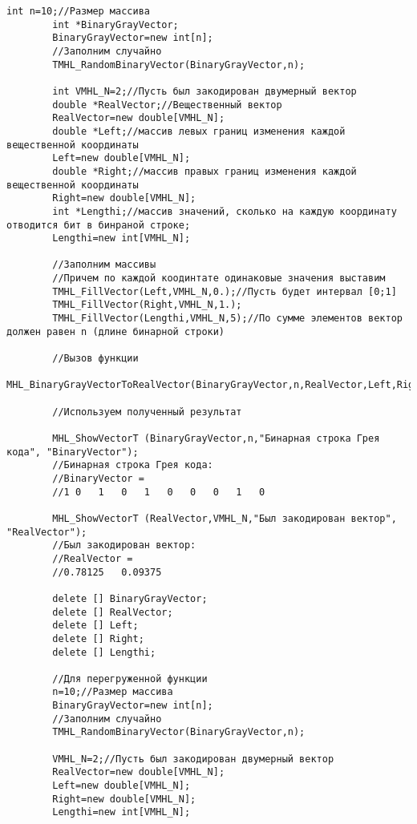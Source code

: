 \documentclass[a4paper,12pt]{article}
\begin{document}
\begin{lstlisting}[label=code_use_MHL_BinaryGrayVectorToRealVector,caption=Пример использования]
        int n=10;//Размер массива
        int *BinaryGrayVector;
        BinaryGrayVector=new int[n];
        //Заполним случайно
        TMHL_RandomBinaryVector(BinaryGrayVector,n);

        int VMHL_N=2;//Пусть был закодирован двумерный вектор
        double *RealVector;//Вещественный вектор
        RealVector=new double[VMHL_N];
        double *Left;//массив левых границ изменения каждой вещественной координаты
        Left=new double[VMHL_N];
        double *Right;//массив правых границ изменения каждой вещественной координаты
        Right=new double[VMHL_N];
        int *Lengthi;//массив значений, сколько на каждую координату отводится бит в бинраной строке;
        Lengthi=new int[VMHL_N];

        //Заполним массивы
        //Причем по каждой коодинтате одинаковые значения выставим
        TMHL_FillVector(Left,VMHL_N,0.);//Пусть будет интервал [0;1]
        TMHL_FillVector(Right,VMHL_N,1.);
        TMHL_FillVector(Lengthi,VMHL_N,5);//По сумме элементов вектор должен равен n (длине бинарной строки)

        //Вызов функции
        MHL_BinaryGrayVectorToRealVector(BinaryGrayVector,n,RealVector,Left,Right,Lengthi,VMHL_N);

        //Используем полученный результат

        MHL_ShowVectorT (BinaryGrayVector,n,"Бинарная строка Грея кода", "BinaryVector");
        //Бинарная строка Грея кода:
        //BinaryVector =
        //1	0	1	0	1	0	0	0	1	0

        MHL_ShowVectorT (RealVector,VMHL_N,"Был закодирован вектор", "RealVector");
        //Был закодирован вектор:
        //RealVector =
        //0.78125	0.09375

        delete [] BinaryGrayVector;
        delete [] RealVector;
        delete [] Left;
        delete [] Right;
        delete [] Lengthi;

        //Для перегруженной функции
        n=10;//Размер массива
        BinaryGrayVector=new int[n];
        //Заполним случайно
        TMHL_RandomBinaryVector(BinaryGrayVector,n);

        VMHL_N=2;//Пусть был закодирован двумерный вектор
        RealVector=new double[VMHL_N];
        Left=new double[VMHL_N];
        Right=new double[VMHL_N];
        Lengthi=new int[VMHL_N];


\end{lstlisting}
\end{document}
